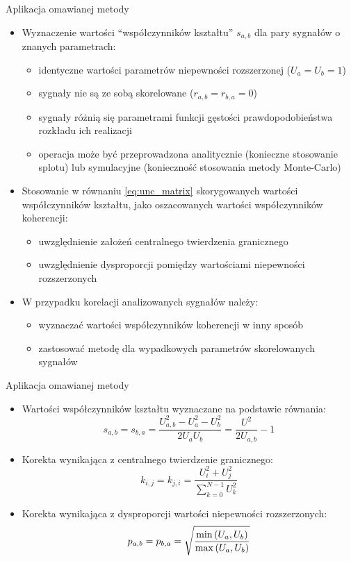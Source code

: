 \documentclass[12pt, polish, aspectratio = 169]{beamer}
\begin{document}
\begin{frame}{Aplikacja omawianej metody}
\begin{itemize}
\item Wyznaczenie wartości \enquote{współczynników kształtu} $s_{a,b}$ dla pary sygnałów o znanych parametrach:
	\begin{itemize}
	\item identyczne wartości parametrów niepewności rozszerzonej ($U_{a} = U_{b} = 1$)
	\item sygnały nie są ze sobą skorelowane ($r_{a,b} = r_{b,a} = 0$)
	\item sygnały różnią się parametrami funkcji gęstości prawdopodobieństwa rozkładu ich realizacji
	\item operacja może być przeprowadzona analitycznie (konieczne stosowanie splotu) lub symulacyjne (konieczność stosowania metody Monte-Carlo)
	\end{itemize}
\item Stosowanie w równaniu \eqref{eq:unc_matrix} skorygowanych wartości współczynników kształtu, jako oszacowanych wartości współczynników koherencji:
	\begin{itemize}
	\item uwzględnienie założeń centralnego twierdzenia granicznego
	\item uwzględnienie dysproporcji pomiędzy wartościami niepewności rozszerzonych
	\end{itemize}
\item W przypadku korelacji analizowanych sygnałów należy:
	\begin{itemize}
	\item wyznaczać wartości współczynników koherencji w inny sposób
	\item zastosować metodę dla wypadkowych parametrów skorelowanych sygnałów
	\end{itemize}
\end{itemize}
\end{frame}

\begin{frame}{Aplikacja omawianej metody}
\begin{itemize}
\item Wartości współczynników kształtu wyznaczane na podstawie równania:
\begin{equation}
s_{a,b} = s_{b,a} = \frac{U_{a,b}^{2} - U_{a}^{2} - U_{b}^{2}}{2 U_{a} U_{b}} = \frac{U^{2}}{2 U_{a,b}} - 1 \label{eq:unc_shapertwo}
\end{equation}
\item Korekta wynikająca z centralnego twierdzenie granicznego:
\begin{equation}
k_{i,j} = k_{j,i} = \frac{U_{i}^{2} + U_{j}^{2}}{\sum _{k = 0} ^{N-1} U_{k}^{2}} \label{eq:unc_cohercorrb}
\end{equation}
\item Korekta wynikająca z dysproporcji wartości niepewności rozszerzonych:
\begin{equation}
p_{a,b} = p_{b,a} = \sqrt{\frac{\min \left(U_{a}, U_{b}\right)}{\max \left(U_{a}, U_{b}\right)}} \label{eq:unc_cohercorra}
\end{equation}
\end{itemize}
\end{frame}
\end{document}
